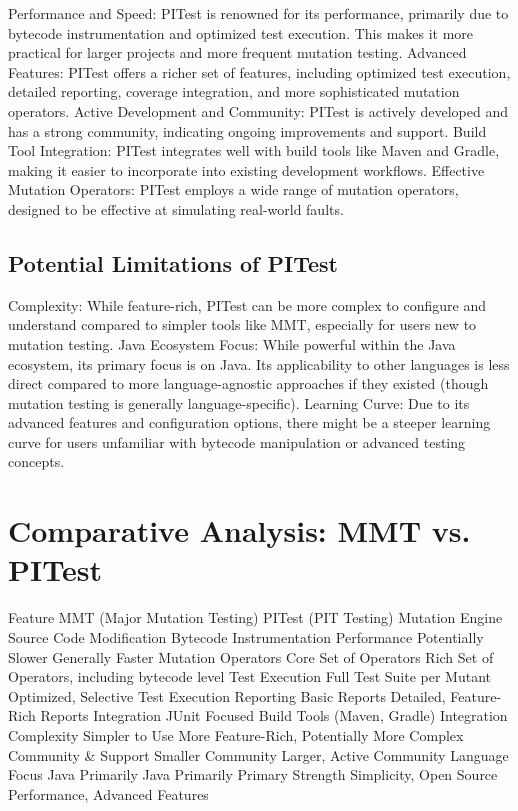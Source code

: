 \documentclass[sigplan, nonacm]{acmart}
\begin{document}
Performance and Speed: PITest is renowned for its performance, primarily due to bytecode instrumentation and optimized test execution. This makes it more practical for larger projects and more frequent mutation testing.
Advanced Features: PITest offers a richer set of features, including optimized test execution, detailed reporting, coverage integration, and more sophisticated mutation operators.
Active Development and Community: PITest is actively developed and has a strong community, indicating ongoing improvements and support.
Build Tool Integration: PITest integrates well with build tools like Maven and Gradle, making it easier to incorporate into existing development workflows.
Effective Mutation Operators: PITest employs a wide range of mutation operators, designed to be effective at simulating real-world faults.
\subsection{Potential Limitations of PITest}

Complexity: While feature-rich, PITest can be more complex to configure and understand compared to simpler tools like MMT, especially for users new to mutation testing.
Java Ecosystem Focus: While powerful within the Java ecosystem, its primary focus is on Java. Its applicability to other languages is less direct compared to more language-agnostic approaches if they existed (though mutation testing is generally language-specific).
Learning Curve: Due to its advanced features and configuration options, there might be a steeper learning curve for users unfamiliar with bytecode manipulation or advanced testing concepts.
\section{Comparative Analysis: MMT vs. PITest}

Feature	MMT (Major Mutation Testing)	PITest (PIT Testing)
Mutation Engine	Source Code Modification	Bytecode Instrumentation
Performance	Potentially Slower	Generally Faster
Mutation Operators	Core Set of Operators	Rich Set of Operators, including bytecode level
Test Execution	Full Test Suite per Mutant	Optimized, Selective Test Execution
Reporting	Basic Reports	Detailed, Feature-Rich Reports
Integration	JUnit Focused	Build Tools (Maven, Gradle) Integration
Complexity	Simpler to Use	More Feature-Rich, Potentially More Complex
Community & Support	Smaller Community	Larger, Active Community
Language Focus	Java Primarily	Java Primarily
Primary Strength	Simplicity, Open Source	Performance, Advanced Features
\end{document}
